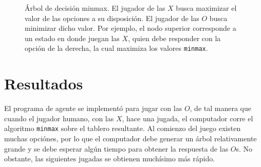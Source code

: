 \documentclass[11pt]{article}
\begin{document}
\begin{figure}
\begin{center}
{
} %
\end{center}
\caption{Árbol de decisión minmax. El jugador de las $X$ busca maximizar el valor de las opciones a su disposición. El jugador de las $O$ busca minimizar dicho valor. Por ejemplo, el nodo superior corresponde a un estado en donde juegan las $X$, quien debe responder con la opción de la derecha, la cual maximiza los valores \texttt{minmax}.}\label{fig:arbol_minmax}
\end{figure}


\section{Resultados}

\noindent El programa de agente se implementó para jugar con las $O$, de tal manera que cuando el jugador humano, con las $X$, hace una jugada, el computador corre el algoritmo \texttt{minmax} sobre el tablero resultante. Al comienzo del juego existen muchas opciónes, por lo que el computador debe generar un árbol relativamente grande y se debe esperar algún tiempo para obtener la respuesta de las $O$s. No obstante, las siguientes jugadas se obtienen muchísimo más rápido.
\end{document}

